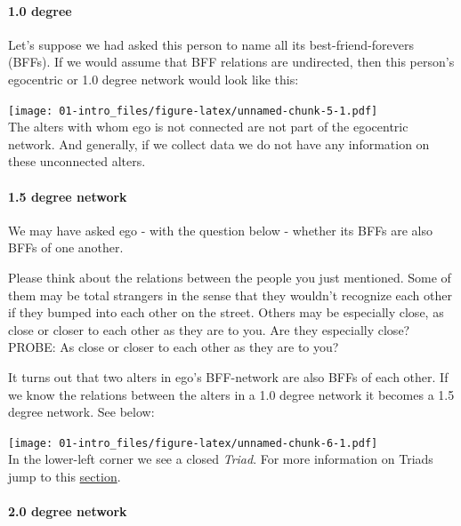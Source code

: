 \documentclass[
]{book}
\begin{document}
\hypertarget{degree}{%
\paragraph{1.0 degree}\label{degree}}

Let's suppose we had asked this person to name all its best-friend-forevers (BFFs). If we would assume that BFF relations are undirected, then this person's egocentric or 1.0 degree network would look like this:

\texttt{[image: 01-intro\_files/figure-latex/unnamed-chunk-5-1.pdf]}\\
The alters with whom ego is not connected are not part of the egocentric network. And generally, if we collect data we do not have any information on these unconnected alters.

\hypertarget{degree-network}{%
\paragraph{1.5 degree network}\label{degree-network}}

We may have asked ego - with the question below - whether its BFFs are also BFFs of one another.

Please think about the relations between the people you just mentioned. Some of them may be total strangers in the sense that they wouldn't recognize each other if they bumped into each other on the street. Others may be especially close, as close or closer to each other as they are to you. Are they especially close? PROBE: As close or closer to each other as they are to you?

It turns out that two alters in ego's BFF-network are also BFFs of each other. If we know the relations between the alters in a 1.0 degree network it becomes a 1.5 degree network. See below:

\texttt{[image: 01-intro\_files/figure-latex/unnamed-chunk-6-1.pdf]}\\
In the lower-left corner we see a closed \emph{Triad}. For more information on Triads jump to this \href{https://www.jochemtolsma.nl/courses/complete-networks/socio2/\#triad-level}{section}.

\hypertarget{degree-network-1}{%
\paragraph{2.0 degree network}\label{degree-network-1}}
\end{document}
